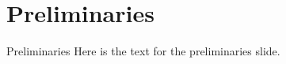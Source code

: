 \section{Preliminaries}
\begin{frame}{Preliminaries}
Here is the text for the preliminaries slide.
\end{frame}

